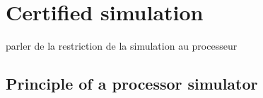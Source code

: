 \documentclass[a4paper, 11pt]{article}
\begin{document}
  \section{Certified simulation}
parler de la restriction de la simulation au processeur
\subsection{Principle of a processor simulator}


\end{document}
